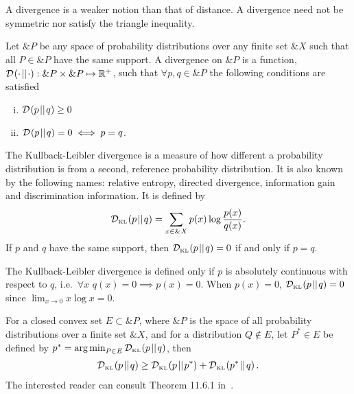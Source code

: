 \begin{remark}
  A divergence is a weaker notion than that of distance. A divergence
  need not be symmetric nor satisfy the triangle inequality.
\end{remark}

\begin{definition}
  Let $\&P$ be any space of probability distributions over any finite set $\&X$
  such that all $P \in \&P$ have the same support. A \textnormal{\sffamily
    divergence} on $\&P$ is a function, $\Divgen{\cdot}{\cdot}: \&P \times \&P
  \mapsto \R^+$, such that $\forall p, q \in \&P$ the following conditions are
  satisfied
  \begin{enumerate}[(i)]
    \item $\Divgen{p}{q} \geq 0$
    \item $\Divgen{p}{q} = 0 \iff p = q$.
  \end{enumerate}
\end{definition}

\begin{definition}%
  \label{def:kl-divergence}
  The \textnormal{\sffamily Kullback-Leibler divergence} is a measure of how
  different a probability distribution is from a second, reference probability
  distribution. It is also known by the following names: \textnormal{\sffamily
    relative entropy}, \textnormal{\sffamily directed divergence},
  \textnormal{\sffamily information gain} and \textnormal{\sffamily
    discrimination information}. It is defined by
  \begin{align}
    \label{eq:KL}
    \KL{p}{q} = \sum_{x \in \&X} p(x) \log{p(x) \over q(x)}.
  \end{align}
  If $p$ and $q$ have the same support, then $\KL{p}{q} = 0$ if and
  only if $p = q$.
\end{definition}

\begin{remark}
  The Kullback-Leibler divergence is defined only if $p$ is absolutely
  continuous with respect to $q$, i.e.\ $\forall x$
  $q(x) = 0 \implies p(x) = 0$.  When $p(x) = 0$, $\KL{p}{q} = 0$
  since $\lim_{x \to 0} x\log{x} = 0$.
\end{remark}

\begin{theorem}
  For a closed convex set $E \subset \&P$, where $\&P$ is the space of
  all probability distributions over a finite set $\&X$, and for a
  distribution $Q \not \in E$, let $P^* \in E$ be defined by
  $p^* = \argmin_{P \in E} \KL{p}{q}$, then
  \begin{align}
   \KL{p}{q} \geq \KL{p}{p^*} + \KL{p^*}{q}.
  \end{align}
  The interested reader can consult Theorem 11.6.1 in~\cite{ref:cover-thomas}.
\end{theorem}

